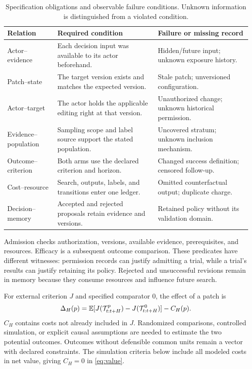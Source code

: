 \begin{table}[t]
\caption{Specification obligations and observable failure conditions. Unknown information is distinguished from a violated condition.}
\label{tab:obligations}\small
\begin{tabularx}{\linewidth}{@{}p{.19\linewidth}YY@{}}\toprule
Relation & Required condition & Failure or missing record \\\midrule
Actor--evidence & Each decision input was available to its actor beforehand. & Hidden/future input; unknown exposure history. \\
Patch--state & The target version exists and matches the expected version. & Stale patch; unversioned configuration. \\
Actor--target & The actor holds the applicable editing right at that version. & Unauthorized change; unknown historical permission. \\
Evidence--population & Sampling scope and label source support the stated population. & Uncovered stratum; unknown inclusion mechanism. \\
Outcome--criterion & Both arms use the declared criterion and horizon. & Changed success definition; censored follow-up. \\
Cost--resource & Search, outputs, labels, and transitions enter one ledger. & Omitted counterfactual output; duplicate charge. \\
Decision--memory & Accepted and rejected proposals retain evidence and versions. & Retained policy without its validation domain. \\\bottomrule
\end{tabularx}
\end{table}

Admission checks authorization, versions, available evidence, prerequisites, and resources. Efficacy is a subsequent outcome comparison. These predicates have different witnesses: permission records can justify admitting a trial, while a trial's results can justify retaining its policy. Rejected and unsuccessful revisions remain in memory because they consume resources and influence future search.

For external criterion $J$ and specified comparator $0$, the effect of a patch is
\begin{equation}
\Delta_H(p)=\mathbb{E}[J(\mathcal{T}_{t:t+H}^{p})-J(\mathcal{T}_{t:t+H}^{0})]-C_H(p).
\label{eq:value}
\end{equation}
$C_H$ contains costs not already included in $J$. Randomized comparisons, controlled simulation, or explicit causal assumptions are needed to estimate the two potential outcomes. Outcomes without defensible common units remain a vector with declared constraints. The simulation criteria below include all modeled costs in net value, giving $C_H=0$ in \cref{eq:value}.

